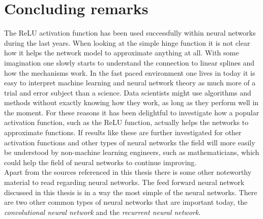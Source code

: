 \documentclass[11pt, letterpaper]{amsart}
\begin{document}
\section{Concluding remarks}
The ReLU activation function has been used successfully within neural networks during the last years. When looking at the simple hinge function it is not clear how it helps the network model to approximate anything at all. With some imagination one slowly starts to understand the connection to linear splines and how the mechanisms work. In the fast paced environment one lives in today it is easy to interpret machine learning and neural network theory as much more of a trial and error subject than a science. Data scientists might use algorithms and methods without exactly knowing how they work, as long as they perform well in the moment. For these reasons it has been delightful to investigate how a popular activation function, such as the ReLU function, actually helps the networks to approximate functions. If results like these are further investigated for other activation functions and other types of neural networks the field will more easily be understood by non-machine learning engineers, such as mathematicians, which could help the field of neural networks to continue improving.
\\

Apart from the sources referenced in this thesis there is some other noteworthy material to read regarding neural networks. The feed forward neural network discussed in this thesis is in a way the most simple of the neural networks. There are two other common types of neural networks that are important today, the \textit{convolutional neural network} and the \textit{recurrent neural network}.
\\
\end{document}

